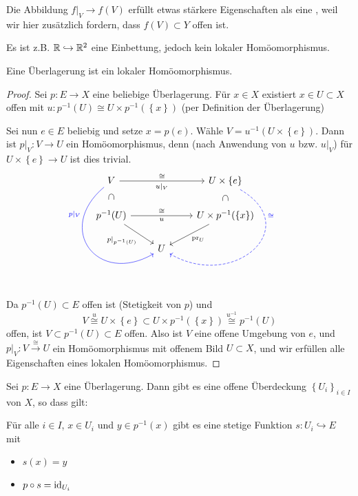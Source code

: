 \begin{oral}
    Die Abbildung $f|_V \to  f(V)$ erfüllt etwas stärkere Eigenschaften als eine , weil wir hier zusätzlich fordern, dass $f(V)\subset Y$ offen ist.

    Es ist z.B. $\mathbb{R} \hookrightarrow \mathbb{R}^2$ eine Einbettung, jedoch kein lokaler Homöomorphismus.
\end{oral}

\begin{lemma}\label{lm:überlagerung-ist-lokaler-homöomorphismus}
    Eine Überlagerung ist ein lokaler Homöomorphismus.
\end{lemma}

\begin{proof}
   Sei $p\colon  E \to  X$ eine beliebige Überlagerung. Für $x\in X$ existiert $x\in U\subset X$ offen mit $u\colon p^{-1} (U) \cong U\times p^{-1} (\left \{x\right\} )$ (per Definition der Überlagerung) 

   Sei nun $e\in E$ beliebig und setze $x = p(e)$. Wähle  $V = u^{-1}(U\times \left \{e\right\} )$. Dann ist $p|_V \colon  V \to  U$ ein Homöomorphismus, denn (nach Anwendung von $u$ bzw.  $u|_V$) für $U\times \left \{e\right\} \to U$ ist dies trivial.
\[
    \begin{tikzcd}
        V \ar[out=220, in = 210,looseness=2,blue, near start,swap]{ddr}{p|_V} \ar{rr}{\cong}[swap]{u|_V}\ar[phantom]{d}[rotate=-90]{\subset }& &U \times \left \{e\right\} \ar[phantom]{d}[rotate=-90]{\subset } \ar[out=-30, in = -30,looseness=2,blue,dashed,near start]{ddl}{\cong}\\
        p^{-1} (U) \ar[swap]{dr}{p|_{p^{-1} (U)}} \ar{rr}{\cong}[swap]{u} & & U\times p^{-1} (\left \{x\right\} ) \ar{dl}{\pr_U}\\
                   & U 
    \end{tikzcd}
\]
Da $p^{-1} (U)\subset E$ offen ist (Stetigkeit von $p$) und 
\[V \stackrel{u}{\cong}U\times \left \{e\right\} \subset U\times p^{-1} (\left \{x\right\} ) \stackrel{u^{-1}}{\cong} p^{-1} (U)
\]
offen, ist $V\subset p^{-1} (U)\subset E$ offen. Also ist $V$ eine offene Umgebung von  $e$, und  $p|_V \colon  V \stackrel{\cong}{\longrightarrow} U$ ein Homöomorphismus mit offenem Bild $U\subset X$, und wir erfüllen alle Eigenschaften eines lokalen Homöomorphismus.
\end{proof}

\begin{lemma}\label{lm:offene-überdeckung-von-überlagerung-mit-homöomorphismen}
    Sei $p\colon  E \to  X$ eine Überlagerung. Dann gibt es eine offene Überdeckung $\left \{U_i\right\} _{i \in I}$ von $X$, so dass gilt:

    Für alle $i\in I$, $x\in U_i$ und $y\in p^{-1} (x)$ gibt es eine stetige Funktion $s\colon  U_i \hookrightarrow   E$ mit 
    \begin{itemize}
        \item $s(x) = y$
        \item  $p \circ s = \operatorname{id}_{U_i}$
    \end{itemize}
\end{lemma}

